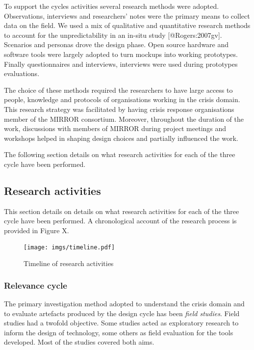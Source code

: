 To support the cycles activities several research methods were adopted.
Observations, interviews and researchers' notes were the primary means
to collect data on the field. We used a mix of qualitative and
quantitative research methods to account for the unpredictability in an
in-situ study {[}@Rogers:2007gv{]}. Scenarios and personas drove the
design phase. Open source hardware and software tools were largely
adopted to turn mockups into working prototypes. Finally questionnaires
and interviews, interviews were used during prototypes evaluations.

The choice of these methods required the researchers to have large
access to people, knowledge and protocols of organisations working in
the crisis domain. This research strategy was facilitated by having
crisis response organisations member of the MIRROR consortium. Moreover,
throughout the duration of the work, discussions with members of MIRROR
during project meetings and workshops helped in shaping design choices
and partially influenced the work.

The following section details on what research activities for each of
the three cycle have been performed.

\subsection{Research activities}\label{research-activities}

This section details on details on what research activities for each of
the three cycle have been performed. A chronological account of the
research process is provided in Figure X.

\begin{figure}[htbp]
\centering
\texttt{[image: imgs/timeline.pdf]}
\caption{Timeline of research activities}
\end{figure}

\subsubsection{Relevance cycle}\label{relevance-cycle}

The primary investigation method adopted to understand the crisis domain
and to evaluate artefacts produced by the design cycle has been
\emph{field studies}. Field studies had a twofold objective. Some
studies acted as exploratory research to inform the design of
technology, some others as field evaluation for the tools developed.
Most of the studies covered both aims.

